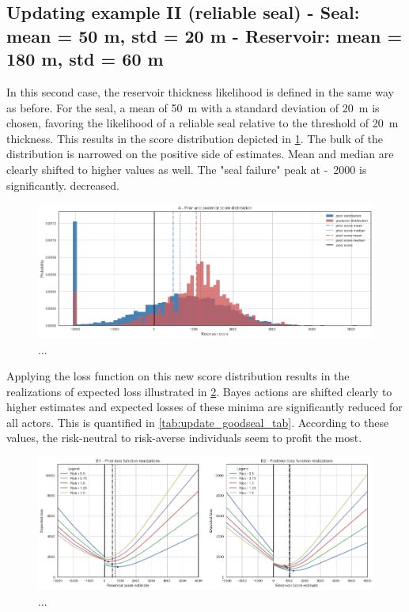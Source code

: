 	\subsection{Updating example II (reliable seal) - Seal: mean = 50 m, std = 20 m - Reservoir: mean = 180 m, std = 60 m}
	
	In this second case, the reservoir thickness likelihood is defined in the same way as before. For the seal, a mean of 50~m with a standard deviation of 20~m is chosen, favoring the likelihood of a reliable seal relative to the threshold of 20~m thickness. This results in the score distribution depicted in \ref{fig:update_goodseal2}. The bulk of the distribution is narrowed on the positive side of estimates. Mean and median are clearly shifted to higher values as well. The "seal failure" peak at -~2000 is significantly. decreased.
	
	\begin{figure}[h]
		\centering
		\includegraphics[width=1\textwidth]{Figures/update_goodseal2.png}
		\caption{...}\label{fig:update_goodseal2} 
	\end{figure}
	
	Applying the loss function on this new score distribution results in the realizations of expected loss illustrated in \ref{fig:update_goodseal3}. Bayes actions are shifted clearly to higher estimates and expected losses of these minima are significantly reduced for all actors. This is quantified in \ref{tab:update_goodseal_tab}. According to these values, the risk-neutral to risk-averse individuals seem to profit the most.
	
	\begin{figure}[h]
		\centering
		\includegraphics[width=1\textwidth]{Figures/update_goodseal3.png}
		\caption{...}\label{fig:update_goodseal3} 
	\end{figure}
	
